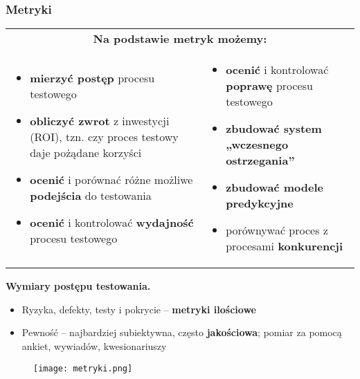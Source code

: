 \documentclass[../main.tex]{subfiles}
\begin{document}
    \subsubsection{Metryki}
    \begin{table}[H]
        \begin{center}
            \begin{tabular}{p{8cm} p{8cm}}
                \multicolumn{2}{c}{\textbf{ Na podstawie metryk możemy:}}\\
                \begin{itemize}
                    \item \textbf{mierzyć postęp} procesu testowego
                    \item \textbf{obliczyć zwrot} z inwestycji (ROI), tzn. czy proces testowy daje pożądane korzyści
                    \item \textbf{ocenić} i porównać różne możliwe \textbf{podejścia} do testowania
                    \item \textbf{ocenić} i kontrolować \textbf{wydajność} procesu testowego
                \end{itemize}
                &
                \begin{itemize}
                    \item \textbf{ocenić} i kontrolować \textbf{poprawę} procesu testowego
                    \item \textbf{zbudować system „wczesnego ostrzegania”}
                    \item \textbf{zbudować modele predykcyjne}
                    \item porównywać proces z procesami \textbf{konkurencji}
                \end{itemize}\\
            \end{tabular}
        \end{center}
    \end{table}

    \textbf{Wymiary postępu testowania.}
    \begin{itemize}
        \item Ryzyka, defekty, testy i pokrycie – \textbf{metryki ilościowe}
        \item Pewność – najbardziej subiektywna, często \textbf{jakościowa}; pomiar za pomocą ankiet, wywiadów, kwesionariuszy
    \end{itemize}

    \begin{figure}[H]
        \texttt{[image: metryki.png]}
    \end{figure}
\end{document}
